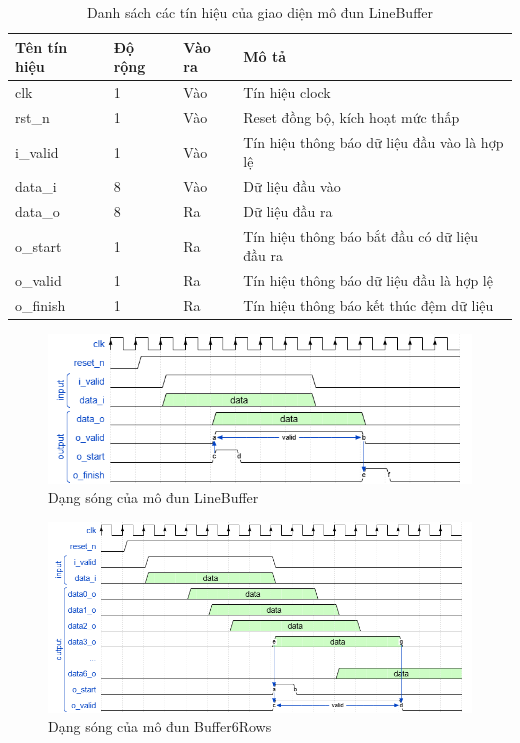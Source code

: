 \begin{table}[h]
    \centering
    \renewcommand{\arraystretch}{1.3} %
    \begin{tabular}{|p{3cm} p{2cm} p{2cm} p{8cm}|}
        \hline
        \rowcolor{gray!30}
        \textbf{Tên tín hiệu} & \textbf{Độ rộng} & \textbf{Vào ra} & \textbf{Mô tả} \\
        \hline
        clk & 1 & Vào & Tín hiệu clock \\
        \hline
        rst\_n & 1 & Vào & Reset đồng bộ, kích hoạt mức thấp \\
        \hline
        i\_valid & 1 & Vào & Tín hiệu thông báo dữ liệu đầu vào là hợp lệ
        \\ \hline
        data\_i & 8 & Vào & Dữ liệu đầu vào
        \\ \hline
        data\_o & 8 & Ra & Dữ liệu đầu ra
        \\ \hline
        o\_start & 1& Ra & Tín hiệu thông báo bắt đầu có dữ liệu đầu ra
        \\ \hline
        o\_valid & 1& Ra & Tín hiệu thông báo dữ liệu đầu là hợp lệ
        \\ \hline
        o\_finish & 1 & Ra & Tín hiệu thông báo kết thúc đệm dữ liệu        
        \\ \hline
    \end{tabular}
    \caption{Danh sách các tín hiệu của giao diện mô đun LineBuffer}
    \label{tab:signalListLineBuffer}
\end{table}
\begin{figure}[!ht]
    \centering
    \includegraphics[width=1\linewidth]{figures/lineBuffer.png}
    \caption{Dạng sóng của mô đun LineBuffer}
    \label{fig:lineBuffer}
\end{figure}
\begin{figure}[!ht]
    \centering
    \includegraphics[width=1\linewidth]{figures/Buffer6Rows.png}
    \caption{Dạng sóng của mô đun Buffer6Rows}
    \label{fig:Buffer6Rows}
\end{figure}

